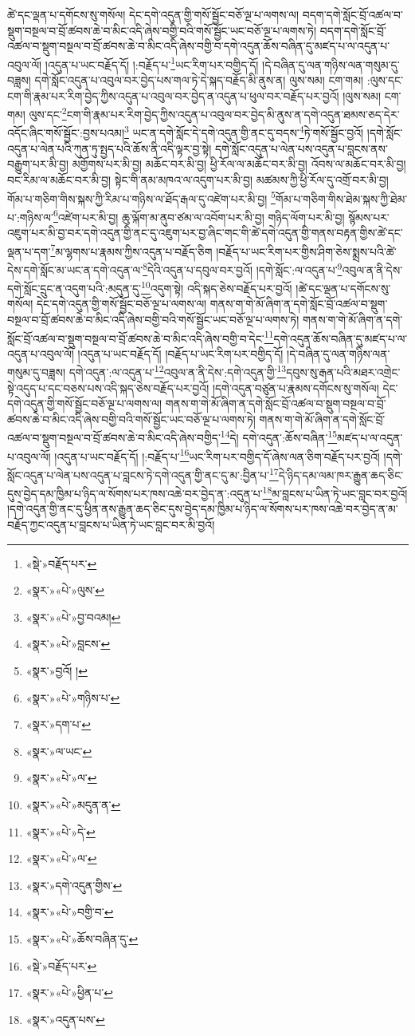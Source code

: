 ཚེ་དང་ལྡན་པ་དགོངས་སུ་གསོལ། དེང་དགེ་འདུན་གྱི་གསོ་སྦྱོང་བཅོ་ལྔ་པ་ལགས་ལ། བདག་དགེ་སློང་བྲོ་འཚལ་བ་སྡུག་བསྔལ་བ་བྲོ་ཚབས་ཆེ་བ་མིང་འདི་ཞེས་བགྱི་བའི་གསོ་སྦྱོང་ཡང་བཅོ་ལྔ་པ་ལགས་ཏེ། བདག་དགེ་སློང་བྲོ་འཚལ་བ་སྡུག་བསྔལ་བ་བྲོ་ཚབས་ཆེ་བ་མིང་འདི་ཞེས་བགྱི་བ་དགེ་འདུན་ཆོས་བཞིན་དུ་མཛད་པ་ལ་འདུན་པ་འབུལ་ལོ། །འདུན་པ་ཡང་བརྗོད་དོ། །:བརྗོད་པ་\footnote{«སྡེ་»བརྗོད་པར་}ཡང་རིག་པར་བགྱིད་དོ། །དེ་བཞིན་དུ་ལན་གཉིས་ལན་གསུམ་དུ་བཟླས། དགེ་སློང་འདུན་པ་འབུལ་བར་བྱེད་པས་གལ་ཏེ་དེ་སྐད་བརྗོད་མི་ནུས་ན། ལུས་སམ། ངག་གམ། :ལུས་དང་ངག་གི་རྣམ་པར་རིག་བྱེད་ཀྱིས་འདུན་པ་འབུལ་བར་བྱེད་ན་འདུན་པ་ཕུལ་བར་བརྗོད་པར་བྱའོ། །ལུས་སམ། ངག་གམ། ལུས་དང་\footnote{«སྣར་»«པེ་»ལུས་}ངག་གི་རྣམ་པར་རིག་བྱེད་ཀྱིས་འདུན་པ་འབུལ་བར་བྱེད་མི་ནུས་ན་དགེ་འདུན་ཐམས་ཅད་དེར་འདོང་ཞིང་གསོ་སྦྱོང་:བྱས་པའམ།\footnote{«སྣར་»«པེ་»བྱ་བའམ།} ཡང་ན་དགེ་སློང་དེ་དགེ་འདུན་གྱི་ནང་དུ་བདས་\footnote{«སྣར་»«པེ་»བླངས་}ཏེ་གསོ་སྦྱོང་བྱའོ། །དགེ་སློང་འདུན་པ་ལེན་པའི་ཀུན་ཏུ་སྤྱད་པའི་ཆོས་ནི་འདི་ལྟར་བྱ་སྟེ། དགེ་སློང་འདུན་པ་ལེན་པས་འདུན་པ་བླངས་ནས་བརྒྱུག་པར་མི་བྱ། མགྱོགས་པར་མི་བྱ། མཆོང་བར་མི་བྱ། ཕྱི་རོལ་ལ་མཆོང་བར་མི་བྱ། འོབས་ལ་མཆོང་བར་མི་བྱ། བང་རིམ་ལ་མཆོང་བར་མི་བྱ། སྟེང་གི་ནམ་མཁའ་ལ་འདུག་པར་མི་བྱ། མཚམས་ཀྱི་ཕྱི་རོལ་དུ་འགྲོ་བར་མི་བྱ། གོམ་པ་གཅིག་གིས་སྐས་ཀྱི་རིམ་པ་གཉིས་ལ་ཐོད་རྒལ་དུ་འཛེག་པར་མི་བྱ། \footnote{«སྣར་»བྱའོ། ། }གོམ་པ་གཅིག་གིས་ཐེམ་སྐས་ཀྱི་ཐེམ་པ་:གཉིས་ལ་\footnote{«སྣར་»«པེ་»གཉིས་པ་}འཛེག་པར་མི་བྱ། ཆུ་ལྐོག་མ་ནུབ་ཙམ་ལ་འབོག་པར་མི་བྱ། གཉིད་ལོག་པར་མི་བྱ། སྙོམས་པར་འཇུག་པར་མི་བྱ་བར་དགེ་འདུན་གྱི་ནང་དུ་འཇུག་པར་བྱ་ཞིང་གང་གི་ཚེ་དགེ་འདུན་གྱི་གནས་བརྟན་གྱིས་ཚེ་དང་ལྡན་པ་དག་\footnote{«སྣར་»དག་པ་}མ་ལྷགས་པ་རྣམས་ཀྱིས་འདུན་པ་བརྗོད་ཅིག །བརྗོད་པ་ཡང་རིག་པར་གྱིས་ཤིག་ཅེས་སྨྲས་པའི་ཚེ་དེས་དགེ་སློང་མ་ཡང་ན་དགེ་འདུན་ལ་\footnote{«སྣར་»ལ་ཡང་}དེའི་འདུན་པ་དབུལ་བར་བྱའོ། །དགེ་སློང་:ལ་འདུན་པ་\footnote{«སྣར་»«པེ་»ལ་}འབུལ་ན་ནི་དེས་དགེ་སློང་དྲུང་ན་འདུག་པའི་:མདུན་དུ་\footnote{«སྣར་»«པེ་»མདུན་ན་}འདུག་སྟེ། འདི་སྐད་ཅེས་བརྗོད་པར་བྱའོ། །ཚེ་དང་ལྡན་པ་དགོངས་སུ་གསོལ། དེང་དགེ་འདུན་གྱི་གསོ་སྦྱོང་བཅོ་ལྔ་པ་ལགས་ལ། གནས་ག་གེ་མོ་ཞིག་ན་དགེ་སློང་བྲོ་འཚལ་བ་སྡུག་བསྔལ་བ་བྲོ་ཚབས་ཆེ་བ་མིང་འདི་ཞེས་བགྱི་བའི་གསོ་སྦྱོང་ཡང་བཅོ་ལྔ་པ་ལགས་ཏེ། གནས་ག་གེ་མོ་ཞིག་ན་དགེ་སློང་བྲོ་འཚལ་བ་སྡུག་བསྔལ་བ་བྲོ་ཚབས་ཆེ་བ་མིང་འདི་ཞེས་བགྱི་བ་དེང་\footnote{«སྣར་»«པེ་»དེ་}དགེ་འདུན་ཆོས་བཞིན་དུ་མཛད་པ་ལ་འདུན་པ་འབུལ་ལོ། །འདུན་པ་ཡང་བརྗོད་དོ། །བརྗོད་པ་ཡང་རིག་པར་བགྱིད་དོ། །དེ་བཞིན་དུ་ལན་གཉིས་ལན་གསུམ་དུ་བཟླས། དགེ་འདུན་:ལ་འདུན་པ་\footnote{«སྣར་»«པེ་»ལ་}འབུལ་ན་ནི་དེས་:དགེ་འདུན་གྱི་\footnote{«སྣར་»དགེ་འདུན་གྱིས་}དབུས་སུ་རྒན་པའི་མཐར་འགྲེང་སྟེ་འདུད་པ་དང་བཅས་པས་འདི་སྐད་ཅེས་བརྗོད་པར་བྱའོ། །དགེ་འདུན་བཙུན་པ་རྣམས་དགོངས་སུ་གསོལ། དེང་དགེ་འདུན་གྱི་གསོ་སྦྱོང་བཅོ་ལྔ་པ་ལགས་ལ། གནས་ག་གེ་མོ་ཞིག་ན་དགེ་སློང་བྲོ་འཚལ་བ་སྡུག་བསྔལ་བ་བྲོ་ཚབས་ཆེ་བ་མིང་འདི་ཞེས་བགྱི་བའི་གསོ་སྦྱོང་ཡང་བཅོ་ལྔ་པ་ལགས་ཏེ། གནས་ག་གེ་མོ་ཞིག་ན་དགེ་སློང་བྲོ་འཚལ་བ་སྡུག་བསྔལ་བ་བྲོ་ཚབས་ཆེ་བ་མིང་འདི་ཞེས་བགྱིད་\footnote{«སྣར་»«པེ་»བགྱི་བ་}དེ། དགེ་འདུན་:ཆོས་བཞིན་\footnote{«སྣར་»«པེ་»ཆོས་བཞིན་དུ་}མཛད་པ་ལ་འདུན་པ་འབུལ་ལོ། །འདུན་པ་ཡང་བརྗོད་དོ། །:བརྗོད་པ་\footnote{«སྡེ་»བརྗོད་པར་}ཡང་རིག་པར་བགྱིད་དོ་ཞེས་ལན་ཅིག་བརྗོད་པར་བྱའོ། །དགེ་སློང་འདུན་པ་ལེན་པས་འདུན་པ་བླངས་ཏེ་དགེ་འདུན་གྱི་ནང་དུ་མ་:བྱིན་པ་\footnote{«སྣར་»«པེ་»ཕྱིན་པ་}དེ་ཉིད་དམ་ལམ་ཁར་རྒྱུན་ཆད་ཅིང་དུས་བྱེད་དམ་ཁྱིམ་པ་ཉིད་ལ་སོགས་པར་ཁས་འཆེ་བར་བྱེད་ན་:འདུན་པ་\footnote{«སྣར་»འདུན་པས་}མ་བླངས་པ་ཡིན་ཏེ་ཡང་བླང་བར་བྱའོ། །དགེ་འདུན་གྱི་ནང་དུ་ཕྱིན་ནས་རྒྱུན་ཆད་ཅིང་དུས་བྱེད་དམ་ཁྱིམ་པ་ཉིད་ལ་སོགས་པར་ཁས་འཆེ་བར་བྱེད་ན་མ་བརྗོད་ཀྱང་འདུན་པ་བླངས་པ་ཡིན་ཏེ་ཡང་བླང་བར་མི་བྱའོ། 